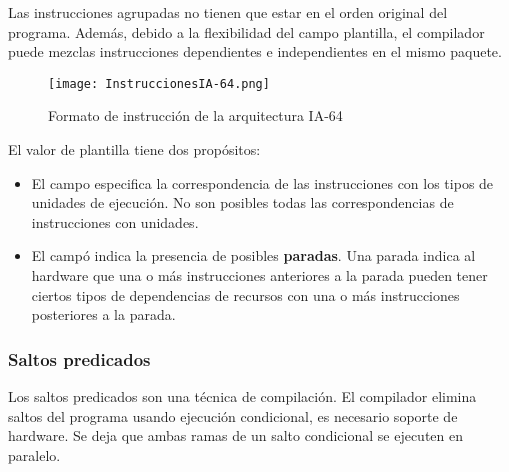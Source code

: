 Las instrucciones agrupadas no tienen que estar en el orden original del programa. Además, debido a la flexibilidad del campo plantilla, el compilador puede mezclas instrucciones dependientes e independientes en el mismo paquete.

\begin{figure}[h]
  \centering
  \texttt{[image: InstruccionesIA-64.png]}
  \caption{Formato de instrucción de la arquitectura IA-64}
\end{figure}

El valor de plantilla tiene dos propósitos:

\begin{itemize}
  \item El campo especifica la correspondencia de las instrucciones con los tipos de unidades de ejecución. No son posibles todas las correspondencias de instrucciones con unidades.
  \item El campó indica la presencia de posibles \textbf{paradas}. Una parada indica al hardware que una o más instrucciones anteriores a la parada pueden tener ciertos tipos de dependencias de recursos con una o más instrucciones posteriores a la parada.
\end{itemize}

\subsubsection*{Saltos predicados}

Los saltos predicados son una técnica de compilación. El compilador elimina saltos del programa usando ejecución condicional, es necesario soporte de hardware. Se deja que ambas ramas de un salto condicional se ejecuten en paralelo.